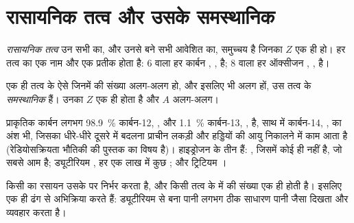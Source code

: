 \section{रासायनिक तत्व और उसके समस्थानिक}

\begin{definition}[रासायनिक तत्व]\label{def:g9:inside-the-atom:element}
\emph{रासायनिक तत्व} उन सभी  का, और उनसे बने
सभी आवेशित  का, समुच्चय है जिनका  $Z$ एक ही हो। हर
तत्व का एक नाम और एक प्रतीक होता है: 6  वाला हर  कार्बन
, , है; 8  वाला हर  ऑक्सीजन , , है।
\end{definition}

\begin{definition}[समस्थानिक]\label{def:g9:inside-the-atom:isotope}
एक ही तत्व के ऐसे  जिनमें  की संख्या अलग-अलग हो, और इसलिए
 भी अलग हों, उस तत्व के \emph{समस्थानिक}
हैं। उनका $Z$ एक ही होता है और $A$ अलग-अलग।
\end{definition}

\begin{example}[कार्बन और हाइड्रोजन के समस्थानिक]\label{ex:g9:inside-the-atom:isotopes}
प्राकृतिक कार्बन लगभग \qty{98.9}{\percent} कार्बन-12, ,
और \qty{1.1}{\percent} कार्बन-13, , है, साथ में कार्बन-14,
, का अंश भी, जिसका धीरे-धीरे दूसरे  में बदलना प्राचीन
लकड़ी और हड्डियों की आयु निकालने में काम आता है (रेडियोसक्रियता भौतिकी की
पुस्तक का विषय है)। हाइड्रोजन के तीन  हैं: , जिसमें
कोई  ही नहीं है, जो सबसे आम है; ड्यूटीरियम , हर एक लाख
में कुछ ; और ट्रिटियम ।
\end{example}

\begin{proposition}\label{prop:g9:inside-the-atom:alike}
किसी  का रसायन उसके  पर निर्भर करता है, और किसी तत्व के
 में  की संख्या एक ही होती है। इसलिए  एक ही
ढंग से अभिक्रिया करते हैं: ड्यूटीरियम से बना पानी लगभग ठीक साधारण पानी
जैसा दिखता और व्यवहार करता है।
\end{proposition}

